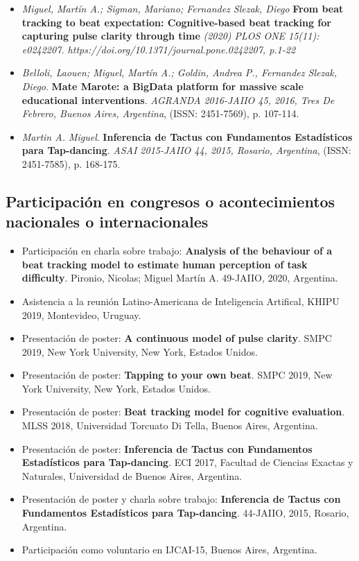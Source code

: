 \documentclass[a4paper,10pt]{article}
\begin{document}
\begin{itemize}
    \item 
    \emph{Miguel, Martín A.; Sigman, Mariano; Fernandez Slezak, Diego}
    \textbf{From beat tracking to beat expectation: Cognitive-based beat
    tracking for capturing pulse clarity through time} 
    \emph{(2020) PLOS ONE 15(11): e0242207.
        https://doi.org/10.1371/journal.pone.0242207, p.1-22}
    \item 
\emph{Belloli, Laouen; Miguel, Martín A.; Goldin, Andrea P., Fernandez Slezak,
        Diego}.
\textbf{Mate Marote: a BigData platform for massive scale educational
        interventions}.
        \emph{AGRANDA 2016-JAIIO 45, 2016, Tres De Febrero, Buenos Aires,
        Argentina}, (ISSN: 2451-7569), p. 107-114.
    \item 
\emph{Martin A. Miguel}.
\textbf{Inferencia de Tactus con Fundamentos Estadísticos para Tap-dancing}.
        \emph{ASAI 2015-JAIIO 44, 2015, Rosario, Argentina}, (ISSN: 2451-7585),
        p. 168-175.
\end{itemize}

\subsection{Participación en congresos o acontecimientos nacionales o
internacionales}

\begin{itemize}
    \item Participación en charla sobre trabajo:
\textbf{Analysis of the behaviour of a beat tracking model to estimate human
        perception of task difficulty}. Pironio, Nicolas; Miguel Martín A. 49-JAIIO, 2020, Argentina.
    \item Asistencia a la reunión Latino-Americana de Inteligencia Artifical,
        KHIPU 2019, Montevideo, Uruguay.
    \item Presentación de poster:
        \textbf{A continuous model of pulse clarity}.
        SMPC 2019, New York University, New York, Estados Unidos.
    \item Presentación de poster:
        \textbf{Tapping to your own beat}.
        SMPC 2019, New York University, New York, Estados Unidos.
    \item Presentación de poster:
        \textbf{Beat tracking model for cognitive evaluation}.
        MLSS 2018, Universidad Torcuato Di Tella, Buenos Aires, Argentina.
    \item Presentación de poster: \textbf{Inferencia de Tactus con Fundamentos Estadísticos para
Tap-dancing}.
    ECI 2017, Facultad de Ciencias Exactas y Naturales, Universidad de Buenos
        Aires, Argentina.
    \item Presentación de poster y charla sobre trabajo:
\textbf{Inferencia de Tactus con Fundamentos Estadísticos para
        Tap-dancing}. 44-JAIIO, 2015, Rosario, Argentina.
    \item Participación como voluntario en IJCAI-15, Buenos Aires, Argentina.
\end{itemize}
\end{document}

